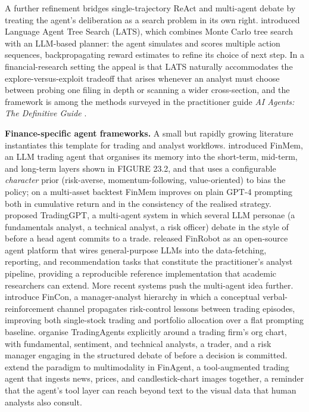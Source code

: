 A further refinement bridges single-trajectory ReAct and multi-agent debate by treating the agent's deliberation as a search problem in its own right. \cite{zhou2024lats} introduced Language Agent Tree Search (LATS), which combines Monte Carlo tree search with an LLM-based planner: the agent simulates and scores multiple action sequences, backpropagating reward estimates to refine its choice of next step. In a financial-research setting the appeal is that LATS naturally accommodates the explore-versus-exploit tradeoff that arises whenever an analyst must choose between probing one filing in depth or scanning a wider cross-section, and the framework is among the methods surveyed in the practitioner guide \textit{AI Agents: The Definitive Guide} \citep{koenigstein2025agents}.

\textbf{Finance-specific agent frameworks.} A small but rapidly growing literature instantiates this template for trading and analyst workflows. \cite{yu2024finmem} introduced FinMem, an LLM trading agent that organises its memory into the short-term, mid-term, and long-term layers shown in FIGURE 23.2, and that uses a configurable \textit{character} prior (risk-averse, momentum-following, value-oriented) to bias the policy; on a multi-asset backtest FinMem improves on plain GPT-4 prompting both in cumulative return and in the consistency of the realised strategy. \cite{li2023tradinggpt} proposed TradingGPT, a multi-agent system in which several LLM personae (a fundamentals analyst, a technical analyst, a risk officer) debate in the style of \cite{du2023multiagent} before a head agent commits to a trade. \cite{yang2024finrobot} released FinRobot as an open-source agent platform that wires general-purpose LLMs into the data-fetching, reporting, and recommendation tasks that constitute the practitioner's analyst pipeline, providing a reproducible reference implementation that academic researchers can extend. More recent systems push the multi-agent idea further. \cite{yu2024fincon} introduce FinCon, a manager-analyst hierarchy in which a conceptual verbal-reinforcement channel propagates risk-control lessons between trading episodes, improving both single-stock trading and portfolio allocation over a flat prompting baseline. \cite{xiao2024tradingagents} organise TradingAgents explicitly around a trading firm's org chart, with fundamental, sentiment, and technical analysts, a trader, and a risk manager engaging in the structured debate of \cite{du2023multiagent} before a decision is committed. \cite{zhang2024finagent} extend the paradigm to multimodality in FinAgent, a tool-augmented trading agent that ingests news, prices, and candlestick-chart images together, a reminder that the agent's tool layer can reach beyond text to the visual data that human analysts also consult.

